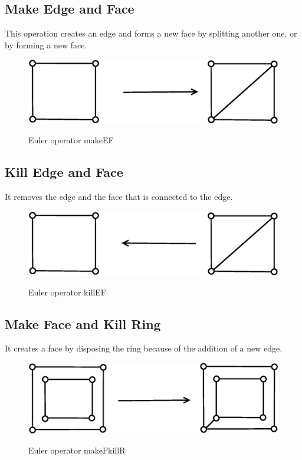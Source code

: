 \subsection{Make Edge and Face}

This operation creates an edge and forms a new face by splitting another one, or by forming a new
face.

\begin{figure}[H]
\centering
\includegraphics[scale=0.25]{../img/makeEF.eps}
\label{fig:makeef}
\caption{Euler operator makeEF}
\end{figure}

\subsection{Kill Edge and Face}

It removes the edge and the face that is connected to the edge.

\begin{figure}[H]
\centering
\includegraphics[scale=0.25]{../img/killEF.eps}
\label{fig:killef}
\caption{Euler operator killEF}
\end{figure}

\subsection{Make Face and Kill Ring}

It creates a face by disposing the ring because of the addition of a new edge.

\begin{figure}[H]
\centering
\includegraphics[scale=0.25]{../img/makeFkillR.eps}
\label{fig:makefkillr}
\caption{Euler operator makeFkillR}
\end{figure}


